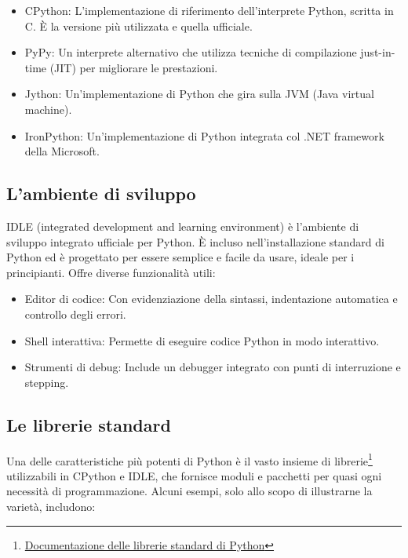 \documentclass[
  letterpaper,
  DIV=11,
  numbers=noendperiod]{scrreprt}
\providecommand{\tightlist}{%
  \setlength{\itemsep}{0pt}\setlength{\parskip}{0pt}}\usepackage{longtable,booktabs,array}
\begin{document}
\begin{itemize}
\tightlist
\item
  CPython: L'implementazione di riferimento dell'interprete Python,
  scritta in C. È la versione più utilizzata e quella ufficiale.
\item
  PyPy: Un interprete alternativo che utilizza tecniche di compilazione
  just-in-time (JIT) per migliorare le prestazioni.
\item
  Jython: Un'implementazione di Python che gira sulla JVM (Java virtual
  machine).
\item
  IronPython: Un'implementazione di Python integrata col .NET framework
  della Microsoft.
\end{itemize}

\subsection{L'ambiente di sviluppo}\label{lambiente-di-sviluppo}

IDLE (integrated development and learning environment) è l'ambiente di
sviluppo integrato ufficiale per Python. È incluso nell'installazione
standard di Python ed è progettato per essere semplice e facile da
usare, ideale per i principianti. Offre diverse funzionalità utili:

\begin{itemize}
\tightlist
\item
  Editor di codice: Con evidenziazione della sintassi, indentazione
  automatica e controllo degli errori.
\item
  Shell interattiva: Permette di eseguire codice Python in modo
  interattivo.
\item
  Strumenti di debug: Include un debugger integrato con punti di
  interruzione e stepping.
\end{itemize}

\subsection{Le librerie standard}\label{le-librerie-standard}

Una delle caratteristiche più potenti di Python è il vasto insieme di
librerie\footnote{\href{https://docs.python.org/3/library/index.html}{Documentazione
  delle librerie standard di Python}} utilizzabili in CPython e IDLE,
che fornisce moduli e pacchetti per quasi ogni necessità di
programmazione. Alcuni esempi, solo allo scopo di illustrarne la
varietà, includono:
\end{document}
